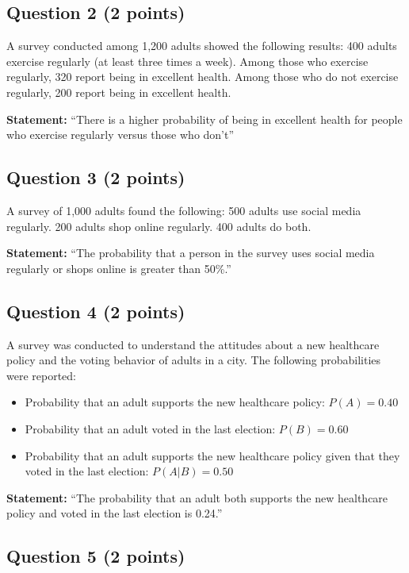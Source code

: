 \documentclass{article}
\begin{document}
\subsection*{Question 2 (2 points)}

A survey conducted among 1,200 adults showed the following results: 400 adults exercise regularly (at least three times a week). Among those who exercise regularly, 320 report being in excellent health. Among those who do not exercise regularly, 200 report being in excellent health.

\textbf{Statement:} ``There is a higher probability of being in excellent health for people who exercise regularly versus those who don't''

\subsection*{Question 3 (2 points)}

A survey of 1,000 adults found the following: 500 adults use social media regularly. 200 adults shop online regularly. 400 adults do both.

\textbf{Statement:} ``The probability that a person in the survey uses social media regularly or shops online is greater than 50\%.''

\subsection*{Question 4 (2 points)}

A survey was conducted to understand the attitudes about a new healthcare policy and the voting behavior of adults in a city. The following probabilities were reported:
\begin{itemize}
    \item Probability that an adult supports the new healthcare policy: \( P(A) = 0.40 \)
    \item Probability that an adult voted in the last election: \( P(B) = 0.60 \)
    \item Probability that an adult supports the new healthcare policy given that they voted in the last election: \( P(A|B) = 0.50 \)
\end{itemize}

\textbf{Statement:} ``The probability that an adult both supports the new healthcare policy and voted in the last election is 0.24.''

\subsection*{Question 5 (2 points)}
\end{document}
